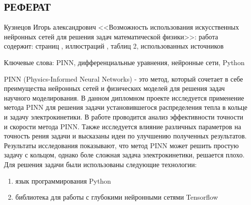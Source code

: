 \documentclass[a4paper,14pt]{extarticle} %
\author{Кузнецов Игорь}
\title{}
\date{\today}
\newcommand\blankpage{%
    \null
    \thispagestyle{empty}%
    \newpage}
\begin{document}
\def\figurename{Рисунок}
\newcommand{\brv}[1]{{\left| #1 \right|}}
\newcommand{\brr}[1]{{\left( #1 \right)}}
\newcommand{\brs}[1]{{\left[ #1 \right]}}
\newcommand{\brc}[1]{{\left\{ #1 \right\}}}
\newcommand{\brn}[1]{{\left\lVert #1 \right\rVert}}
\newcommand{\bra}[1]{{\left\langle #1 \right\rangle}}
\newcommand{\brrl}[1]{{\left( #1 \right]}}
\newcommand{\brrr}[1]{{\left[ #1 \right)}}
\newcommand{\under}[2]{{\underset{#2}{\underbrace{#1}}}}
\newcommand{\strm}[1]{\underset{#1}{\rightarrow}}


\thispagestyle{empty}


\begin{center}
    \section*{РЕФЕРАТ}
\end{center}

Кузнецов Игорь александрович <<Возможность использования искусственных нейронных сетей для решения задач математической физики>>:  работа содержит: страниц , иллюстраций , таблиц 2, использованных источников 

\noindent Ключевые слова: PINN, дифференциальные уравнения, нейронные сети, Python %

PINN (Physics-Informed Neural Networks) - это метод, который сочетает в себе преимущества нейронных сетей и физических моделей для решения задач научного моделирования. В данном дипломном проекте исследуется применение метода PINN для решения задачи установившегося распределения тепла в кольце и задачу электрокинетики. В работе проводится анализ эффективности точности и скорости метода PINN. Также исследуется влияние различных параметров на точность рения задачи и высказаны идеи по улучшению полученных результатов. Результаты исследования показывают, что метод PINN может решить простую задачу с кольцом, однако боле сложная задача электрокинетики, решается плохо.
Для решения задачи были использованы следующие технологии:
\begin{enumerate}[label={\arabic*)}]
    \item язык программирования Python
    \item библиотека для работы с глубокими нейронными сетями Tensorflow
\end{enumerate}
\end{document}
